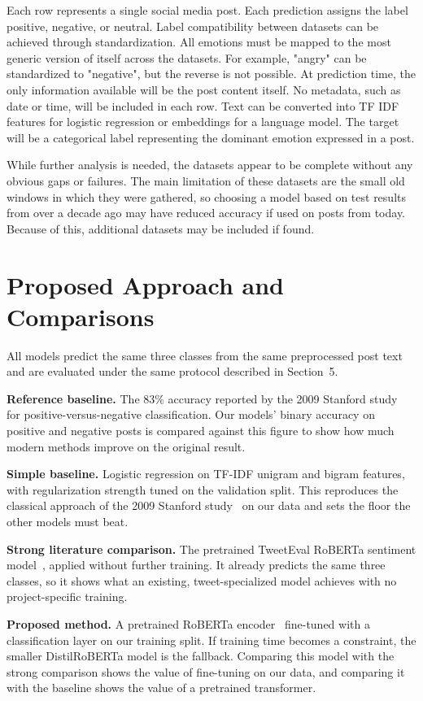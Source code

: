 \documentclass[sigconf,nonacm]{acmart}
\begin{document}
Each row represents a single social media post.  Each prediction assigns the label positive, negative, or neutral.  Label compatibility between datasets can be achieved through standardization.  All emotions must be mapped to the most generic version of itself across the datasets.  For example, "angry" can be standardized to "negative", but the reverse is not possible.  At prediction time, the only information available will be the post content itself.  No metadata, such as date or time, will be included in each row.  Text can be converted into TF IDF features for logistic regression or embeddings for a language model.  The target will be a categorical label representing the dominant emotion expressed in a post.

While further analysis is needed, the datasets appear to be complete without any obvious gaps or failures.  The main limitation of these datasets are the small old windows in which they were gathered, so choosing a model based on test results from over a decade ago may have reduced accuracy if used on posts from today.  Because of this, additional datasets may be included if found.

\section{Proposed Approach and Comparisons}
All models predict the same three classes from the same preprocessed post text and are evaluated under the same protocol described in Section~5.
 
\textbf{Reference baseline.} The 83\% accuracy reported by the 2009 Stanford study~\cite{go2009twitter} for positive-versus-negative classification. Our models' binary accuracy on positive and negative posts is compared against this figure to show how much modern methods improve on the original result.
 
\textbf{Simple baseline.} Logistic regression on TF-IDF unigram and bigram features, with regularization strength tuned on the validation split. This reproduces the classical approach of the 2009 Stanford study~\cite{go2009twitter} on our data and sets the floor the other models must beat.
 
\textbf{Strong literature comparison.} The pretrained TweetEval RoBERTa sentiment model~\cite{barbieri2020tweeteval}, applied without further training. It already predicts the same three classes, so it shows what an existing, tweet-specialized model achieves with no project-specific training.
 
\textbf{Proposed method.} A pretrained RoBERTa encoder~\cite{liu2019roberta} fine-tuned with a classification layer on our training split. If training time becomes a constraint, the smaller DistilRoBERTa model is the fallback. Comparing this model with the strong comparison shows the value of fine-tuning on our data, and comparing it with the baseline shows the value of a pretrained transformer.
 
\end{document}
